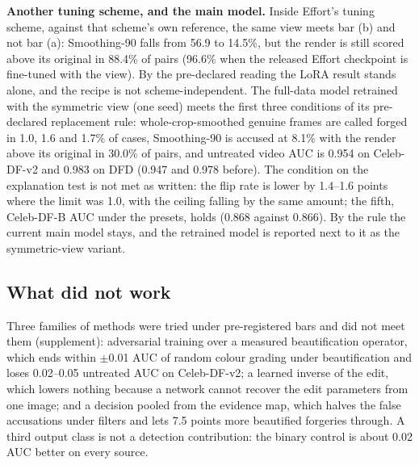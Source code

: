 \documentclass[conference]{IEEEtran}
\begin{document}
\textbf{Another tuning scheme, and the main model.} Inside Effort's tuning scheme, against that scheme's own reference,
the same view meets bar (b) and not bar (a): Smoothing-90 falls from 56.9 to 14.5\%, but the render is still scored
above its original in 88.4\% of pairs (96.6\% when the released Effort checkpoint is fine-tuned with the view). By the
pre-declared reading the LoRA result stands alone, and the recipe is not scheme-independent. The full-data model
retrained with the symmetric view (one seed) meets the first three conditions of its pre-declared replacement rule:
whole-crop-smoothed genuine frames are called forged in 1.0, 1.6 and 1.7\% of cases, Smoothing-90 is accused at 8.1\%
with the render above its original in 30.0\% of pairs, and untreated video AUC is 0.954 on Celeb-DF-v2 and 0.983 on DFD
(0.947 and 0.978 before). The condition on the explanation test is not met as written: the flip rate is lower by
1.4--1.6 points where the limit was 1.0, with the ceiling falling by the same amount; the fifth, Celeb-DF-B AUC under
the presets, holds (0.868 against 0.866). By the rule the current main model stays, and the retrained model is reported
next to it as the symmetric-view variant.

\subsection{What did not work}
\label{sec:negative}
Three families of methods were tried under pre-registered bars and did not meet them (supplement): adversarial
training over a measured beautification operator, which ends within $\pm$0.01 AUC of random colour grading under
beautification and loses 0.02--0.05 untreated AUC on Celeb-DF-v2; a learned inverse of the edit, which lowers nothing
because a network cannot recover the edit parameters from one image; and a decision pooled from the evidence map, which
halves the false accusations under filters and lets 7.5 points more beautified forgeries through. A third output class
is not a detection contribution: the binary control is about 0.02 AUC better on every source.
\end{document}

